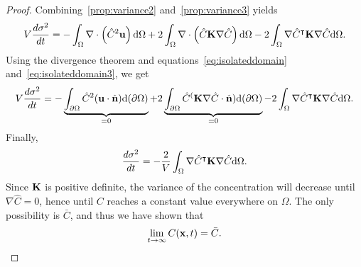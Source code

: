 \begin{proof}
	 Combining~\eqref{prop:variance2} and~\eqref{prop:variance3} yields
	 \begin{equation}
	 	V\frac{d\sigma^2}{dt} = - \int_{\Omega} \nabla \cdot \left(\hat C^2 \mathbf u \right) \mathrm d\Omega + 2 \int_{\Omega} \nabla \cdot \left(\hat C \mathbf K \nabla \hat C \right) \mathrm d\Omega -2 \int_{\Omega} \nabla \hat C^\intercal \mathbf K \nabla \hat C \mathrm d\Omega.
	 \end{equation}
	 Using the divergence theorem and equations~\eqref{eq:isolateddomain} and~\eqref{eq:isolateddomain3}, we get
	 \begin{equation}
	 		V\frac{d\sigma^2}{dt} = - \underbrace{\int_{\partial \Omega} \hat C^2 (\mathbf u \cdot \hat{\mathbf n}) \mathrm d(\partial \Omega)}_{=0} + 2\underbrace{\int_{\partial \Omega} \hat C^ (\mathbf K \nabla \hat C \cdot \hat{\mathbf n}) \mathrm d(\partial \Omega)}_{=0} -2 \int_{\Omega} \nabla \hat C^\intercal \mathbf K \nabla \hat C \mathrm d\Omega.
	 \end{equation}
	 Finally,
	 \begin{equation}
	 	\frac{d\sigma^2}{dt} = -\frac{2}{V} \int_{\Omega} \nabla \hat C^\intercal \mathbf K \nabla \hat C \mathrm d\Omega.
	 \end{equation}
	 Since $\mathbf K$ is positive definite, the variance of the concentration will decrease until $\nabla \hat C = 0$, hence until $C$ reaches a constant value everywhere on $\Omega$. The only possibility is $\bar C$, and thus we have shown that
	 \begin{equation}
	 	\lim_{t\rightarrow \infty} C(\mathbf x,t) = \bar C.
	 \end{equation}
\end{proof}